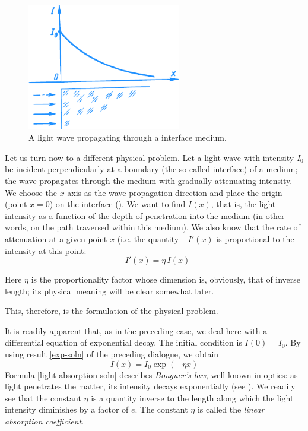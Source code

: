 \begin{figure}[!ht]%
\centering
\includegraphics[width=0.6\textwidth]{figures/fig-57.pdf} 
\caption{A light wave propagating through a interface medium.}
\label{fig-57}
\end{figure}

Let us turn now to a different physical problem. Let a light wave with intensity $I_{0}$ be incident perpendicularly at a boundary (the so-called interface) of a medium; the wave propagates through the medium with gradually attenuating intensity. We choose the $x$-axis as the wave propagation direction and place the origin (point $x = 0$) on the interface (). We want to find $I (x)$, that is, the light intensity as a function of the depth of penetration into the medium (in other words, on the path traversed within this medium). We also know that the rate of attenuation at a given point $x$ (i.e. the quantity $-I' (x)$ is proportional to the intensity at this point:
\begin{equation}%
\boxed{
-I' (x) = \eta \, I(x)}
\label{light-absorption}
\end{equation}

Here $\eta$ is the proportionality factor whose dimension is, obviously, that of inverse length; its physical meaning will be clear somewhat later.

This, therefore, is the formulation of the physical problem.

\rdr It is readily apparent that, as in the preceding case, we deal here with a differential equation of exponential decay. The initial condition is $I (0) = I_{0}$. By using result \eqref{exp-soln} of the preceding dialogue, we obtain
\begin{equation}%
I (x) = I_{0} \exp (- \eta x)
\label{light-absorption-soln}
\end{equation}
\athr Formula \eqref{light-absorption-soln} describes \emph{Bouguer's law}, well
known in optics: as light penetrates the matter, its intensity decays exponentially (see ).  We readily see that the constant $\eta$ is a quantity inverse to the length along which the light intensity diminishes by a factor of $e$. The constant $\eta$ is called the \emph{linear absorption coefficient}.

